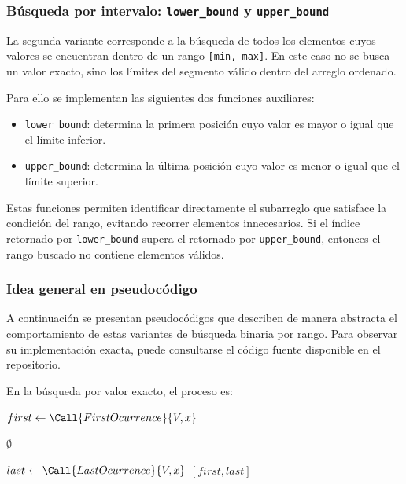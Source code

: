 \subsubsection{Búsqueda por intervalo: \texttt{lower\_bound} y \texttt{upper\_bound}}
La segunda variante corresponde a la búsqueda de todos los elementos cuyos valores se encuentran dentro de un rango \texttt{[min, max]}. En este caso no se busca un valor exacto, sino los límites del segmento válido dentro del arreglo ordenado.

Para ello se implementan las siguientes dos funciones auxiliares:
\begin{itemize}
    \item \texttt{lower\_bound}: determina la primera posición cuyo valor es mayor o igual que el límite inferior.
    \item \texttt{upper\_bound}: determina la última posición cuyo valor es menor o igual que el límite superior.
\end{itemize}
Estas funciones permiten identificar directamente el subarreglo que satisface la condición del rango, evitando recorrer elementos innecesarios. Si el índice retornado por \texttt{lower\_bound} supera el retornado por \texttt{upper\_bound}, entonces el rango buscado no contiene elementos válidos.

\subsubsection{Idea general en pseudocódigo}
A continuación se presentan pseudocódigos que describen de manera abstracta el comportamiento de estas variantes de búsqueda binaria por rango. Para observar su implementación exacta, puede consultarse el código fuente disponible en el repositorio.

En la búsqueda por valor exacto, el proceso es:
\begin{algorithm}
    \caption{Rango de apariciones $\triangleright$ $V[0..n-1]$}
    \begin{algorithmic}[1]
        
        \State $first \gets \Call{FirstOcurrence}{V, x}$

            \State \Return $\emptyset$
        \EndIf

        \State $last \gets \Call{LastOcurrence}{V, x}$
        \State \Return $[first, last]$

        \EndProcedure
    \end{algorithmic}
\end{algorithm}

